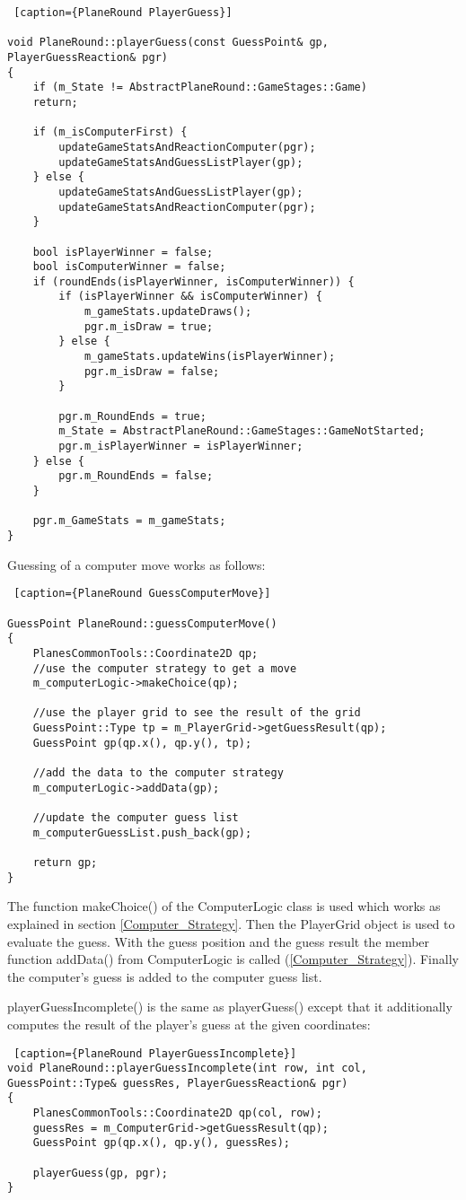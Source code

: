 \begin{lstlisting} [caption={PlaneRound PlayerGuess}]

void PlaneRound::playerGuess(const GuessPoint& gp, PlayerGuessReaction& pgr)
{
	if (m_State != AbstractPlaneRound::GameStages::Game)
	return;
	
	if (m_isComputerFirst) {
		updateGameStatsAndReactionComputer(pgr);
		updateGameStatsAndGuessListPlayer(gp);
	} else {
		updateGameStatsAndGuessListPlayer(gp);
		updateGameStatsAndReactionComputer(pgr);
	}
	
	bool isPlayerWinner = false;
	bool isComputerWinner = false;
	if (roundEnds(isPlayerWinner, isComputerWinner)) {
		if (isPlayerWinner && isComputerWinner) {
			m_gameStats.updateDraws();
			pgr.m_isDraw = true;
		} else {
			m_gameStats.updateWins(isPlayerWinner);
			pgr.m_isDraw = false;
		}
		
		pgr.m_RoundEnds = true;
		m_State = AbstractPlaneRound::GameStages::GameNotStarted;
		pgr.m_isPlayerWinner = isPlayerWinner;
	} else {
		pgr.m_RoundEnds = false;
	}
	
	pgr.m_GameStats = m_gameStats;
}
\end{lstlisting}

Guessing of a computer move works as follows:

\begin{lstlisting} [caption={PlaneRound GuessComputerMove}]

GuessPoint PlaneRound::guessComputerMove()
{
	PlanesCommonTools::Coordinate2D qp;
	//use the computer strategy to get a move
	m_computerLogic->makeChoice(qp);
	
	//use the player grid to see the result of the grid
	GuessPoint::Type tp = m_PlayerGrid->getGuessResult(qp);
	GuessPoint gp(qp.x(), qp.y(), tp);
	
	//add the data to the computer strategy
	m_computerLogic->addData(gp);
	
	//update the computer guess list
	m_computerGuessList.push_back(gp);
	
	return gp;
}

\end{lstlisting}

The function makeChoice() of the ComputerLogic class is used which works as explained in section \ref{Computer_Strategy}. Then the PlayerGrid object is used to evaluate the guess. With the guess position and the guess result the member function addData() from ComputerLogic is called (\ref{Computer_Strategy}). Finally the computer's guess is added to the computer guess list. 

playerGuessIncomplete() is the same as playerGuess() except that it additionally  computes the result of the player's guess at the given coordinates:

\begin {lstlisting} [caption={PlaneRound PlayerGuessIncomplete}]
void PlaneRound::playerGuessIncomplete(int row, int col, GuessPoint::Type& guessRes, PlayerGuessReaction& pgr)
{
	PlanesCommonTools::Coordinate2D qp(col, row);
	guessRes = m_ComputerGrid->getGuessResult(qp);
	GuessPoint gp(qp.x(), qp.y(), guessRes);
	
	playerGuess(gp, pgr);
}
\end{lstlisting}

